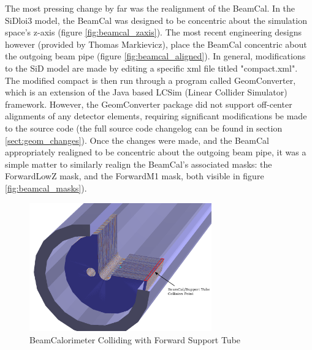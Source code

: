 \documentclass{report}
\begin{document}
            The most pressing change by far was the realignment of the BeamCal. In the SiDloi3 model, the BeamCal was designed to be concentric about the simulation space's z-axis (figure \ref{fig:beamcal_zaxis}). The most recent engineering designs however (provided by Thomas Markievicz), place the BeamCal concentric about the outgoing beam pipe (figure \ref{fig:beamcal_aligned}). In general, modifications to the SiD model are made by editing a specific xml file titled "compact.xml". The modified compact is then run through a program called GeomConverter, which is an extension of the Java based LCSim (Linear Collider Simulator) framework. However, the GeomConverter package did not support off-center alignments of any detector elements, requiring significant modifications be made to the source code (the full source code changelog can be found in section \ref{sect:geom_changes}). Once the changes were made, and the BeamCal appropriately realigned to be concentric about the outgoing beam pipe, it was a simple matter to similarly realign the BeamCal's associated masks: the ForwardLowZ mask, and the ForwardM1 mask, both visible in figure \ref{fig:beamcal_masks}). 

            \begin{figure}[h] 
                \includegraphics[width=0.7\textwidth]{beamcal_collide}
                \centering
                \caption{BeamCalorimeter Colliding with Forward Support Tube}
                \label{fig:beamcal_collide}
            \end{figure}
\end{document}
